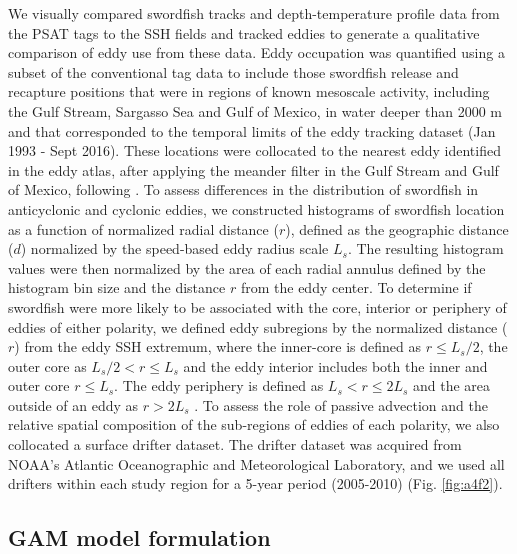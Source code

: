We visually compared swordfish tracks and depth-temperature profile data from the PSAT tags to the SSH fields and tracked eddies to generate a qualitative comparison of eddy use from these data. Eddy occupation was quantified using a subset of the conventional tag data to include those swordfish release and recapture positions that were in regions of known mesoscale activity, including the Gulf Stream, Sargasso Sea and Gulf of Mexico, in water deeper than 2000 m and that corresponded to the temporal limits of the eddy tracking dataset (Jan 1993 - Sept 2016). These locations were collocated to the nearest eddy identified in the eddy atlas, after applying the meander filter in the Gulf Stream and Gulf of Mexico, following \citet{Gaube2017DSR}. To assess differences in the distribution of swordfish in anticyclonic and cyclonic eddies, we constructed histograms of swordfish location as a function of normalized radial distance ($r$), defined as the geographic distance ($d$) normalized by the speed-based eddy radius scale $L_s$.  The resulting histogram values were then normalized by the area of each radial annulus defined by the histogram bin size and the distance $r$ from the eddy center. To determine if swordfish were more likely to be associated with the core, interior or periphery of eddies of either polarity, we defined eddy subregions by the normalized distance ($r$) from the eddy SSH extremum, where the inner-core is defined as $r \leq L_s/2$, the outer core as $L_s/2 < r \leq L_s$ and the eddy interior includes both the inner and outer core $r \leq L_s$. The eddy periphery is defined as $L_s < r \leq 2L_s$ and the area outside of an eddy as $r > 2L_s$ \citep[see Fig. 2 in][]{Gaube2017}. To assess the role of passive advection and the relative spatial composition of the sub-regions of eddies of each polarity, we also collocated a surface drifter dataset. The drifter dataset was acquired from NOAA's Atlantic Oceanographic and Meteorological Laboratory, and we used all drifters within each study region for a 5-year period (2005-2010) (Fig. \cref{fig:a4f2}).

\subsection{GAM model formulation}

